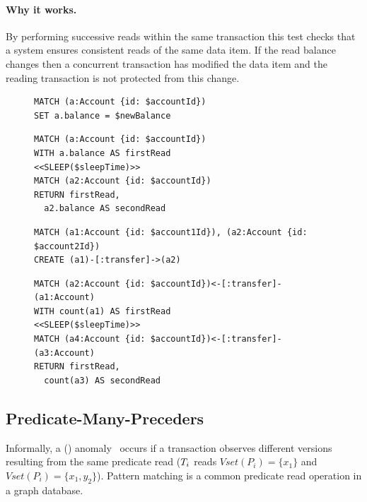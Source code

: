 \paragraph{Why it works.}
By performing successive reads within the same transaction this test checks that
a system ensures consistent reads of the same data item. If the read balance 
changes then a concurrent transaction has modified the data item and the reading
transaction is not protected from this change.

\begin{figure}[htb]
\centering
\begin{minipage}{0.35\linewidth}
\begin{lstlisting}[language=cypher,label=fig:ic1,caption=\tx{IMP $T_\mathrm{W}$}.]
MATCH (a:Account {id: $accountId})
SET a.balance = $newBalance
\end{lstlisting}
\begin{lstlisting}[language=cypher,label=fig:ic2,caption=\tx{IMP $T_\mathrm{R}$}.]
MATCH (a:Account {id: $accountId})
WITH a.balance AS firstRead
<<SLEEP($sleepTime)>>
MATCH (a2:Account {id: $accountId})
RETURN firstRead, 
  a2.balance AS secondRead
\end{lstlisting}
\end{minipage}
\quad
\begin{minipage}{0.61\linewidth}
\begin{lstlisting}[language=cypher,label=fig:pc1,caption=\tx{PMP $T_\mathrm{W}$}.]
MATCH (a1:Account {id: $account1Id}), (a2:Account {id: $account2Id})
CREATE (a1)-[:transfer]->(a2)
\end{lstlisting}
\begin{lstlisting}[language=cypher,label=fig:pc2,caption=\tx{PMP $T_\mathrm{R}$}.]
MATCH (a2:Account {id: $accountId})<-[:transfer]-(a1:Account)
WITH count(a1) AS firstRead
<<SLEEP($sleepTime)>>
MATCH (a4:Account {id: $accountId})<-[:transfer]-(a3:Account)
RETURN firstRead, 
  count(a3) AS secondRead
\end{lstlisting}
\end{minipage}
\end{figure}

\subsection*{Predicate-Many-Preceders}

Informally, a  () 
anomaly~\cite{DBLP:journals/pvldb/BailisDFGHS13} occurs if a transaction observes 
different versions resulting from the same predicate read
(\eg $T_i$ reads
$\textit{Vset}(P_i) =  \{x_1\}$ and
$\textit{Vset}(P_i) = \{x_1,y_2\}$).
Pattern matching is a common predicate read operation in a graph database.

